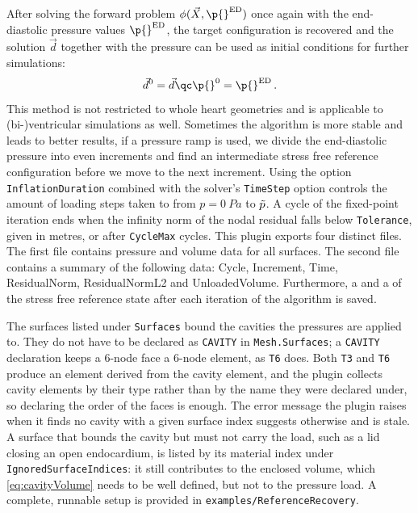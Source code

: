 After solving the forward problem $\phi(\vec X, \p{}^\mathrm{ED})$ once again with the end-diastolic pressure values $\p{}^\mathrm{ED}$, the target configuration is recovered and the solution $\vec d$ together with the pressure can be used as initial conditions for further simulations:
\begin{equation*}
    \vec d^0 = \vec d \qc \p{}^0 = \p{}^\mathrm{ED} \,.
\end{equation*}
This method is not restricted to whole heart geometries and is applicable to (bi-)ventricular simulations as well.
Sometimes the algorithm is more stable and leads to better results, if a pressure ramp is used, \ie we divide the end-diastolic pressure into even increments and find an intermediate stress free reference configuration before we move to the next increment.
Using the option \verb|InflationDuration| combined with the solver's \verb|TimeStep| option controls the amount of loading steps taken to from $p = \SI{0}{Pa}$ to $\Tilde{p}$.
A cycle of the fixed-point iteration ends when the infinity norm of the nodal residual falls below \verb|Tolerance|, given in metres, or after \verb|CycleMax| cycles.
This plugin exports four distinct files.
The first file contains pressure and volume data for all surfaces.
The second file contains a summary of the following data: Cycle, Increment, Time, ResidualNorm, ResidualNormL2 and UnloadedVolume.
Furthermore, a  and a  of the stress free reference state after each iteration of the algorithm is saved.

The surfaces listed under \verb|Surfaces| bound the cavities the pressures are applied to.
They do not have to be declared as \verb|CAVITY| in \verb|Mesh.Surfaces|; a \verb|CAVITY| declaration keeps a 6-node face a 6-node element, as \verb|T6| does.
Both \verb|T3| and \verb|T6| produce an element derived from the cavity element, and the plugin collects cavity elements by their type rather than by the name they were declared under, so declaring the order of the faces is enough.
The error message the plugin raises when it finds no cavity with a given surface index suggests otherwise and is stale.
A surface that bounds the cavity but must not carry the load, such as a lid closing an open endocardium, is listed by its material index under \verb|IgnoredSurfaceIndices|: it still contributes to the enclosed volume, which \autoref{eq:cavityVolume} needs to be well defined, but not to the pressure load.
A complete, runnable setup is provided in \verb|examples/ReferenceRecovery|.

